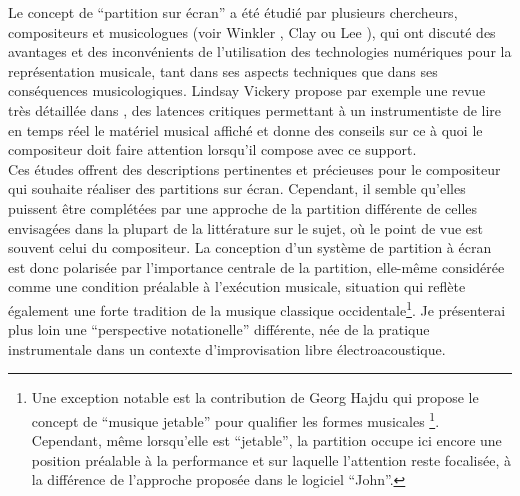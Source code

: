 \indent Le concept de ``partition sur écran'' a été étudié par plusieurs chercheurs, compositeurs et musicologues (voir Winkler \cite{winkler_real-time_2004}, Clay \cite{adams_inventing_2008} ou Lee \cite{lee_real-time_2012}), qui ont discuté des avantages et des inconvénients de l'utilisation des technologies numériques pour la représentation musicale, tant dans ses aspects techniques que dans ses conséquences musicologiques. Lindsay Vickery propose par exemple une revue très détaillée dans \cite{vickery_limitations_2014}, des latences critiques permettant à un instrumentiste de lire en temps réel le matériel musical affiché et donne des conseils sur ce à quoi le compositeur doit faire attention lorsqu'il compose avec ce support.\\
\indent Ces études offrent des descriptions pertinentes et précieuses pour le compositeur qui souhaite réaliser des partitions sur écran. Cependant, il semble qu'elles puissent être complétées par une approche de la partition différente de celles envisagées dans la plupart de la littérature sur le sujet, où le point de vue est souvent celui du compositeur. La conception d'un système de partition à écran est donc polarisée par l'importance centrale de la partition, elle-même considérée comme une condition préalable à l'exécution musicale, situation qui reflète également une forte tradition de la musique classique occidentale\footnote{Une exception notable est la contribution de Georg Hajdu \cite{hajdu_disposable_2016} qui propose le concept de ``musique jetable'' pour qualifier les formes musicales \footnote{}. Cependant, même lorsqu'elle est ``jetable'', la partition occupe ici encore une position préalable à la performance et sur laquelle l'attention reste focalisée, à la différence de l'approche proposée dans le logiciel ``John''.}. Je présenterai plus loin une ``perspective notationelle'' différente, née de la pratique instrumentale dans un contexte d'improvisation libre électroacoustique.



